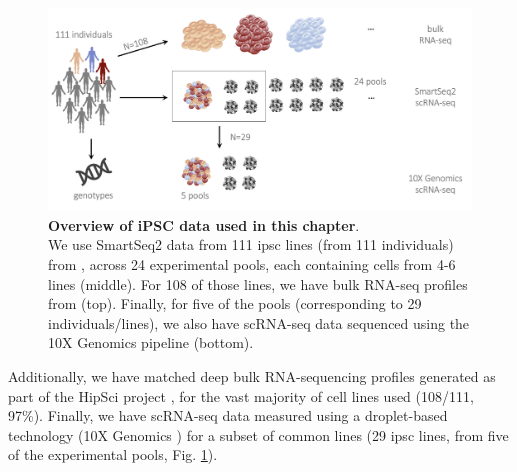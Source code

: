 \vspace{0.5mm}

\begin{figure}[h]
\centering
\includegraphics[width=14cm]{Chapter3/Fig/ips_data.png}
\caption[iPSC data]{\textbf{Overview of iPSC data used in this chapter}.\\
We use SmartSeq2 \cite{purcell2007plink} data from 111 \gls{ipsc} lines (from 111 individuals) from \cite{cuomo2020single}, across 24 experimental pools, each containing cells from 4-6 lines (middle).
For 108 of those lines, we have bulk RNA-seq profiles from \cite{mirauta2018population}(top).
Finally, for five of the pools (corresponding to 29 individuals/lines), we also have scRNA-seq data sequenced using the 10X Genomics pipeline \cite{zheng2017massively}(bottom).}
\label{fig:ipsc_data}
\end{figure}



Additionally, we have matched deep bulk RNA-sequencing profiles generated as part of the HipSci project \cite{kilpinen2017common}, for the vast majority of cell lines used (108/111, 97\%). 
Finally, we have scRNA-seq data measured using a droplet-based technology (10X Genomics \cite{zheng2017massively}) for a subset of common lines (29 \gls{ipsc} lines, from five of the experimental pools, Fig. \ref{fig:ipsc_data}). 

